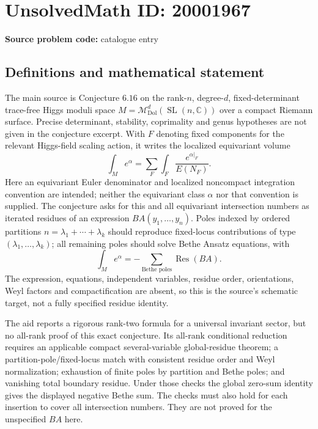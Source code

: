 \documentclass[11pt]{article}
\newcommand{\C}{\mathbb{C}}
\begin{document}
\section*{UnsolvedMath ID: 20001967}
\textbf{Source problem code:} catalogue entry
\subsection{Definitions and mathematical statement}
The main source is Conjecture \(6.16\) on the rank-\(n\), degree-\(d\), fixed-determinant trace-free Higgs moduli space \(M=\mathcal M_{\mathrm{Dol}}^d(\operatorname{SL}(n,\C))\) over a compact Riemann surface. Precise determinant, stability, coprimality and genus hypotheses are not given in the conjecture excerpt. With \(F\) denoting fixed components for the relevant Higgs-field scaling action, it writes the localized equivariant volume
\[
 \int_Me^\alpha=\sum_F\int_F\frac{e^{\alpha|_F}}{E(N_F)}.
\]
Here an equivariant Euler denominator and localized noncompact integration convention are intended; neither the equivariant class \(\alpha\) nor that convention is supplied. The conjecture asks for this and all equivariant intersection numbers as iterated residues of an expression \(BA(y_1,\ldots,y_n)\). Poles indexed by ordered partitions \(n=\lambda_1+\cdots+\lambda_k\) should reproduce fixed-locus contributions of type \((\lambda_1,\ldots,\lambda_k)\); all remaining poles should solve Bethe Ansatz equations, with
\[
 \int_Me^\alpha=-\sum_{\text{Bethe poles}}\operatorname{Res}(BA).
\]
The expression, equations, independent variables, residue order, orientations, Weyl factors and compactification are absent, so this is the source's schematic target, not a fully specified residue identity.

The aid reports a rigorous rank-two formula for a universal invariant sector, but no all-rank proof of this exact conjecture. Its all-rank conditional reduction requires an applicable compact several-variable global-residue theorem; a partition-pole/fixed-locus match with consistent residue order and Weyl normalization; exhaustion of finite poles by partition and Bethe poles; and vanishing total boundary residue. Under those checks the global zero-sum identity gives the displayed negative Bethe sum. The checks must also hold for each insertion to cover all intersection numbers. They are not proved for the unspecified \(BA\) here.
\end{document}
